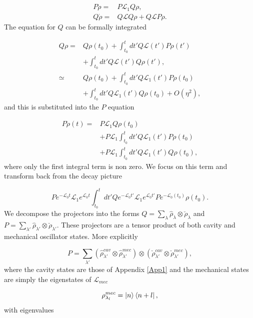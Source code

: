 \documentclass[reprint, amsmath,amssymb, aps,pra]{revtex4-1}
\begin{document}
\begin{align*}
P\dot{\rho} =& P\mathcal{L}_1Q\rho, \\
Q\dot{\rho} =& Q\mathcal{L}Q\rho + Q\mathcal{L}P\rho.
\end{align*} The equation for $Q$ can be formally integrated \cite{TesisMaestria}

\begin{align*}
Q\rho =& Q\rho(t_0) + \int_{t_0}^{t}dt' Q\mathcal{L}(t')P\rho(t')\\
       &+\int_{t_0}^{t}dt'Q\mathcal{L}(t')Q\rho(t'),\\
\simeq & Q\rho(t_0) + \int_{t_0}^{t}dt' Q\mathcal{L}_1(t')P\rho(t_0)\\
       &+\int_{t_0}^{t}dt'Q\mathcal{L}_1(t')Q\rho(t_0)+O(\eta^2),
\end{align*} and this is substituted into the $P$ equation

\begin{align}
P\dot{\rho}(t) =& P\mathcal{L}_1Q\rho(t_0)\\ 
 &+ P\mathcal{L}_1\int_{t_0}^{t}dt' Q\mathcal{L}_1(t')P\rho(t_0)\nonumber \\
 &+ P\mathcal{L}_1\int_{t_0}^{t}dt'Q\mathcal{L}_1(t')Q\rho(t_0) \nonumber,
\end{align} where only the first integral term is non zero. We focus on this term and transform back from the decay picture

\begin{equation}
P e^{-\mathcal{L}_0 t}\mathcal{L}_1e^{\mathcal{L}_0 t}\int_{t_0}^{t}dt'Qe^{-\mathcal{L}_0 t'}\mathcal{L}_1e^{\mathcal{L}_0 t'}Pe^{-\mathcal{L}_0(t_0)}\rho(t_0).
\end{equation}
We decompose the projectors into the forms
$Q=\sum_\lambda \hat{\rho}_\lambda \otimes \check{\rho}_\lambda$ and
$P=\sum_{\lambda'} \hat{\rho}_{\lambda'} \otimes
\check{\rho}_{\lambda'}$. These projectors are a tensor product of both cavity and mechanical oscillator states. More explicitly

\begin{equation}
P = \sum_{\lambda'} (\hat{\rho}_{\lambda'}^{cav}\otimes\hat{\rho}_{\lambda'}^{mec})\otimes(\check{\rho}_{\lambda'}^{cav}\otimes\check{\rho}_{\lambda'}^{mec}),
\end{equation} where the cavity states are those of Appendix \ref{App1} and the mechanical states are simply the eigenstates of $\mathcal{L}_{mec}$

\begin{equation}
\rho_{\lambda_l}^{mec}=\Ket{n}\Bra{n+l},
\end{equation} with eigenvalues
\end{document}
